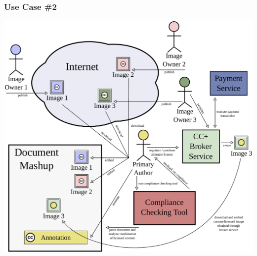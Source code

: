 \documentclass[mathserif,xcolor=dvipsnames,hyperref={bookmarks=true}]{beamer}
\begin{document}
    \begin{frame}[t]
        \frametitle{Use Case \#2}
        \begin{center}
            \includegraphics[width=0.9\textheight]{../resources/usecases/usecase2/usecase2-step40.pdf}
        \end{center}
    \end{frame}
\end{document}
